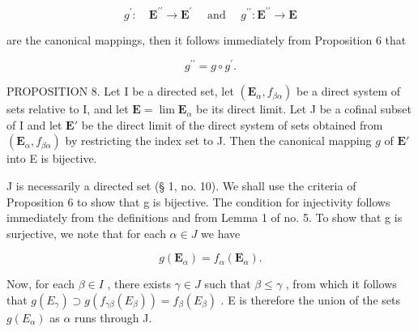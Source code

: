 \[
g ^ {\prime}: \quad \mathbf {E} ^ {\prime \prime} \rightarrow \mathbf {E} ^ {\prime} \quad \text { and } \quad g ^ {\prime \prime}: \mathbf {E} ^ {\prime \prime} \rightarrow \mathbf {E}
\]

are the canonical mappings, then it follows immediately from Proposition 6 that

\[
g ^ {\prime \prime} = g \circ g ^ {\prime}.\tag{28}
\]

PROPOSITION 8. Let I be a directed set, let \((\mathbf{E}_{\alpha}, f_{\beta \alpha})\) be a direct system of sets relative to I, and let \(\mathbf{E} = \lim \mathbf{E}_{\alpha}\) be its direct limit. Let J be a cofinal subset of I and let \(\mathbf{E}'\) be the direct limit of the direct system of sets obtained from \((\mathbf{E}_{\alpha}, f_{\beta \alpha})\) by restricting the index set to J. Then the canonical mapping \(g\) of \(\mathbf{E}'\) into E is bijective.

J is necessarily a directed set (§ 1, no. 10). We shall use the criteria of Proposition 6 to show that g is bijective. The condition for injectivity follows immediately from the definitions and from Lemma 1 of no. 5. To show that g is surjective, we note that for each \(\alpha \in J\) we have

\[
g (\mathbf {E} _ {\alpha}) = f _ {\alpha} (\mathbf {E} _ {\alpha}).
\]

Now, for each \(\beta \in I\) , there exists \(\gamma \in J\) such that \(\beta \leqslant \gamma\) , from which it follows that \(g(E_{\gamma}) \supset g(f_{\gamma \beta}(E_{\beta})) = f_{\beta}(E_{\beta})\) . E is therefore the union of the sets \(g(E_{\alpha})\) as \(\alpha\) runs through J.

